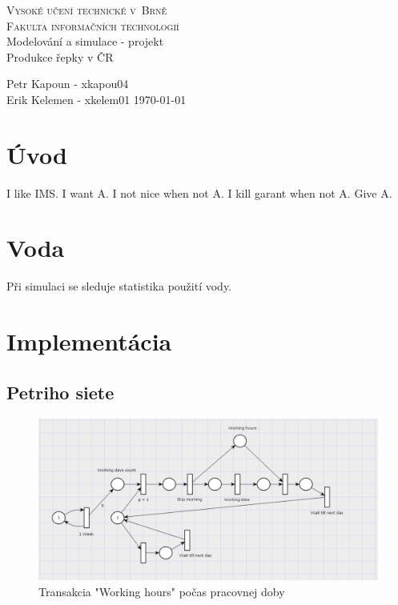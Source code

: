 \documentclass[11pt,a4paper,titlepage]{article}
\begin{document}
\begin{titlepage}
\begin{center}
    {\LARGE\textsc{Vysoké učení technické v~Brně}}\\
    \smallskip
    {\Large\textsc{Fakulta informačních technologií}}\\
    \bigskip
    \LARGE{Modelování a simulace - projekt}\\
    \smallskip
    \Huge{Produkce řepky v ČR}\\
\end{center}
    {\Large Petr Kapoun - xkapou04 \\ Erik Kelemen - xkelem01 \hfill \today }
\end{titlepage}

\tableofcontents
\newpage


\section{Úvod}
I like IMS. I want A. I not nice when not A. I kill garant when not A. Give A.








\section{Voda}
Při simulaci se sleduje statistika použití vody.




\pagebreak
\section{Implementácia}

\subsection{Petriho siete}

\begin{figure}[ht!]
\centering
\includegraphics[scale=0.3]{img/WeekGen.png}
\caption{Transakcia "Working hours" počas pracovnej doby}
\end{figure}
\end{document}
